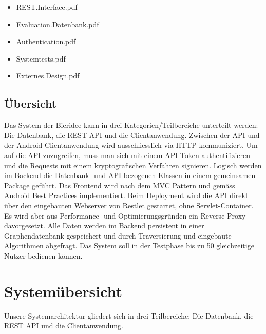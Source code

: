 \documentclass[10pt,a4paper]{scrartcl}
\begin{document}
\begin{itemize}
	\item REST.Interface.pdf
	\item Evaluation.Datenbank.pdf
	\item Authentication.pdf
	\item Systemtests.pdf
	\item Externes.Design.pdf
\end{itemize}

\subsection{Übersicht}

Das System der Bieridee kann in drei Kategorien/Teilbereiche unterteilt werden: Die Datenbank, die
REST API und die Clientanwendung. Zwischen der API und der Android-Clientanwendung wird
ausschliesslich via HTTP kommuniziert. Um auf die API zuzugreifen, muss man sich mit einem
API-Token authentifizieren und die Requests mit einem kryptografischen Verfahren signieren. 
Logisch werden im Backend die Datenbank- und API-bezogenen Klassen in einem gemeinsamen Package
geführt. Das Frontend wird nach dem MVC Pattern und gemäss Android Best Practices implementiert. 
Beim Deployment wird die API direkt über den eingebauten Webserver von Restlet gestartet, ohne
Servlet-Container. Es wird aber aus Performance- und Optimierungsgründen ein Reverse Proxy
davorgesetzt. Alle Daten werden im Backend persistent in einer Graphendatenbank gespeichert und
durch Traversierung und eingebaute Algorithmen abgefragt. Das System soll in der Testphase bis zu
50 gleichzeitige Nutzer bedienen können.


\newpage
\section{Systemübersicht}
Unsere Systemarchitektur gliedert sich in drei Teilbereiche: Die Datenbank, die REST API
und die Clientanwendung.
\end{document}
